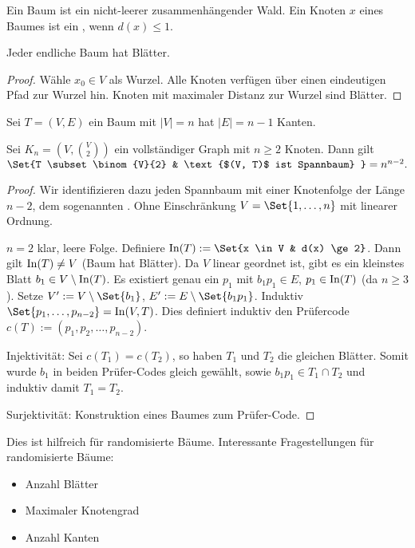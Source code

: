 
\begin{df}
    Ein Baum ist ein nicht-leerer zusammenhängender Wald.
    Ein Knoten $x$ eines Baumes ist ein , wenn $d(x) \le 1$.
\end{df}

\begin{lem}
    Jeder endliche Baum hat Blätter.
    \begin{proof}
        Wähle $x_0 \in V$ als Wurzel.
        Alle Knoten verfügen über einen eindeutigen Pfad zur Wurzel hin.
        Knoten mit maximaler Distanz zur Wurzel sind Blätter.
    \end{proof}
\end{lem}

\begin{kor}
    Sei $T = (V, E)$ ein Baum mit $|V| = n$ hat $|E| = n-1$ Kanten.
\end{kor}

\begin{st}
    Sei $K_n = (V, \binom{V}{2})$ ein vollständiger Graph mit $n \ge 2$ Knoten.
    Dann gilt
    \begin{math}
        \Set{T \subset \binom{V}{2} & \text{$(V, T)$ ist Spannbaum} } = n^{n-2}.
    \end{math}
    \begin{proof}
        Wir identifizieren dazu jeden Spannbaum mit einer Knotenfolge der Länge $n-2$, dem sogenannten .
        Ohne Einschränkung $V = \Set{1, \dotsc, n}$ mit linearer Ordnung.

        $n = 2$ klar, leere Folge.
        Definiere $\In(T) := \Set{x \in V & d(x) \ge 2}$.
        Dann gilt $\operatorname{In}(T) \neq V$ (Baum hat Blätter).
        Da $V$ linear geordnet ist, gibt es ein kleinstes Blatt $b_1 \in V \setminus \operatorname{In}(T)$.
        Es existiert genau ein $p_1$ mit $b_1p_1 \in E$, $p_1 \in \operatorname{In}(T)$ (da $n \ge 3$).
        Setze $V' := V \setminus \Set{b_1}$, $E' := E \setminus \Set{b_1p_1}$.
        Induktiv $\Set{p_1, \dotsc, p_{n-2}} = \In(V, T)$.
        Dies definiert induktiv den Prüfercode $c(T) := (p_1, p_2, \dotsc, p_{n-2})$.

        Injektivität: Sei $c(T_1) = c(T_2)$, so haben $T_1$ und $T_2$ die gleichen Blätter.
        Somit wurde $b_1$ in beiden Prüfer-Codes gleich gewählt, sowie $b_1 p_1 \in T_1 \cap T_2$ und induktiv damit $T_1 = T_2$.

        Surjektivität: Konstruktion eines Baumes zum Prüfer-Code.
    \end{proof}
\end{st}

\begin{note}
    Dies ist hilfreich für randomisierte Bäume.
    Interessante Fragestellungen für randomisierte Bäume:
    \begin{itemize}
        \item
            Anzahl Blätter
        \item
            Maximaler Knotengrad
        \item
            Anzahl Kanten
    \end{itemize}
\end{note}



